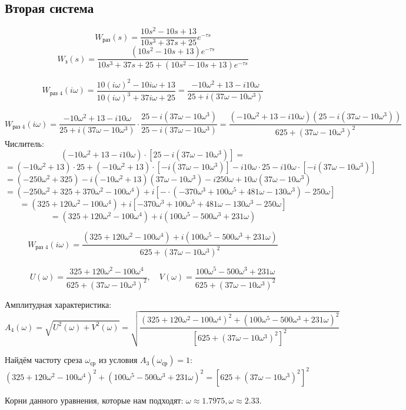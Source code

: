 \subsection{Вторая система}

$$W_{\text{раз}}(s)=\frac{10s^2-10s+13}{10s^3+37s+25}e^{-\tau s}$$
$$W_{\text{з}}(s)=\frac{(10s^2-10s+13)e^{-\tau s}}{10s^3+37s+25+(10s^2-10s+13)e^{-\tau s}}$$

$$W_{\text{раз 4}}(i\omega) = \frac{10(i\omega)^2 - 10i\omega + 13}{10(i\omega)^3 + 37i\omega + 25} = \frac{-10\omega^2 + 13 - i10\omega}{25 + i(37\omega - 10\omega^3)}$$

$$W_{\text{раз 4}}(i\omega)=\frac{-10\omega^2 + 13 - i10\omega}{25 + i(37\omega - 10\omega^3)} \cdot \frac{25 - i(37\omega - 10\omega^3)}{25 - i(37\omega - 10\omega^3)}=\frac{(-10\omega^2 + 13 - i10\omega)(25 - i(37\omega - 10\omega^3))}{625 + (37\omega - 10\omega^3)^2}
$$
Числитель:
$$(-10\omega^2 + 13 - i10\omega) \cdot [25 - i(37\omega - 10\omega^3)] =$$
$$= (-10\omega^2 + 13)\cdot 25 + (-10\omega^2 + 13)\cdot[-i(37\omega - 10\omega^3)] - i10\omega\cdot 25 - i10\omega\cdot[-i(37\omega - 10\omega^3)]$$
$$= (-250\omega^2 + 325) - i(-10\omega^2 + 13)(37\omega - 10\omega^3) - i250\omega + 10\omega(37\omega - 10\omega^3)$$
$$= (-250\omega^2 + 325 + 370\omega^2 - 100\omega^4) + i[-\cdot(-370\omega^3 + 100\omega^5 + 481\omega - 130\omega^3) - 250\omega]$$
$$= (325 + 120\omega^2 - 100\omega^4) + i[-370\omega^3 + 100\omega^5 + 481\omega - 130\omega^3 - 250\omega]$$
$$= (325 + 120\omega^2 - 100\omega^4) + i(100\omega^5 - 500\omega^3 + 231\omega)$$

$$
W_{\text{раз }4}(i\omega)=\frac{(325 + 120\omega^2 - 100\omega^4) + i(100\omega^5 - 500\omega^3 + 231\omega)}{625 + (37\omega - 10\omega^3)^2}$$

$$U(\omega) = \frac{325 + 120\omega^2 - 100\omega^4}{625 + (37\omega - 10\omega^3)^2},\quad V(\omega) = \frac{100\omega^5 - 500\omega^3 + 231\omega}{625 + (37\omega - 10\omega^3)^2}$$

Амплитудная характеристика:
$$A_4(\omega) = \sqrt{U^2(\omega) + V^2(\omega)} = \sqrt{\frac{(325 + 120\omega^2 - 100\omega^4)^2 + (100\omega^5 - 500\omega^3 + 231\omega)^2}{[625 + (37\omega - 10\omega^3)^2]^2}}$$

Найдём частоту среза $\omega_{\text{ср}}$ из условия $A_3(\omega_{\text{ср}}) = 1$:
$$(325 + 120\omega^2 - 100\omega^4)^2 + (100\omega^5 - 500\omega^3 + 231\omega)^2 = [625 + (37\omega - 10\omega^3)^2]^2$$

Корни данного уравнения, которые нам подходят: $\omega\approx1.7975, \omega\approx2.33$.

